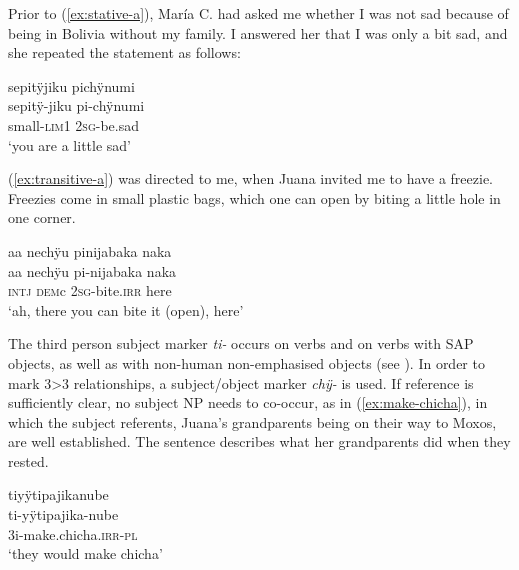 
Prior to (\ref{ex:stative-a}), María C. had asked me whether I was not sad because of being in Bolivia without my family. I answered her that I was only a bit sad, and she repeated the statement as follows:

\ea\label{ex:stative-a}
\begingl 
\glpreamble sepitÿjiku pichÿnumi\\
\gla sepitÿ-jiku pi-chÿnumi\\ 
\glb small-\textsc{lim}1 2\textsc{sg}-be.sad\\ 
\glft ‘you are a little sad’\\ 
\endgl
\trailingcitation{[uxx-e120427l.052]}
\xe


(\ref{ex:transitive-a}) was directed to me, when Juana invited me to have a freezie. Freezies come in small plastic bags, which one can open by biting a little hole in one corner.

\ea\label{ex:transitive-a}
\begingl
\glpreamble aa nechÿu pinijabaka naka\\
\gla aa nechÿu pi-nijabaka naka\\
\glb \textsc{intj} \textsc{dem}c 2\textsc{sg}-bite.\textsc{irr} here\\
\glft ‘ah, there you can bite it (open), here’
\endgl
\trailingcitation{[jxx-e110923l-2.103]}
\xe

The third person subject marker \textit{ti-} occurs on  verbs and on  verbs with SAP objects, as well as with non-human non-emphasised objects (see ). In order to mark 3>3 relationships, a subject/object marker \textit{chÿ-} is used. If reference is sufficiently clear, no subject NP needs to co-occur, as in (\ref{ex:make-chicha}), in which the subject referents, Juana’s grandparents being on their way to Moxos, are well established. The sentence describes what her grandparents did when they rested.

\ea\label{ex:make-chicha}
\begingl
\glpreamble tiyÿtipajikanube\\
\gla ti-yÿtipajika-nube\\
\glb 3i-make.chicha.\textsc{irr}-\textsc{pl}\\
\glft ‘they would make chicha’
\endgl
\trailingcitation{[jxx-p151016l-2.057]}
\xe
{}

